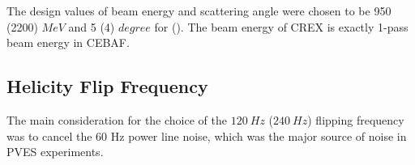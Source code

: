 The design values of beam energy and scattering angle were chosen to be 950 (2200) $MeV$
and 5 (4) $degree$ for \Pb (\Ca). The beam energy of CREX is exactly 1-pass beam
energy in CEBAF.
\begin{comment}
    The measured asymmetry will be:
    \begin{equation*}
	\CA = \frac{2\pi}{R} \int \CA_0(\theta)R(\theta)d\theta
    \end{equation*}

    For PREX-II: average sensitivity reduced by 5\% due to ${}^{12}C$ contamination
    For CREX: average sensitivity reduced by 10\% due to ${}^{40}Ca$ contamination

    While a quartz Cerenkov detector is valued for radiation hardness and insensitivity to soft backgrounds, there is a particular challenge for few GeV electrons. In this energy range, shower fluctuations in a thick or radiated detector significantly degrade energy resolution, while photon statistics degrade the energy resolution for a thin detector. The energy resolution $\Delta E$ at nominal electron energy E increases the statistical error that one would have with infinite resolution $\sigma_0$ to obtain the total statistical error:
$$ \sigma = \sigma_0\sqrt{1+\left(\frac{\Delta E}{E}\right)^2}$$
    
Based on experience in the PREX experiment, we expect an reduction of statistical precision of a factor of 1.06 due to detector resolution.

\bigskip
Using HRS of Hall A, a \textbf{small} scattering angle maximizes the FOM. 
Given practical constraints on how low an angle ($4^\circ$) we can reach with 
septum magnets, the energy is fixed and turns out to be 2.2 GeV, which is a 
natural 1-pass beam energy for CEBAF operations in the 12 GeV era.
\end{comment}

\subsection{Helicity Flip Frequency}
The main consideration for the choice of the $120\ Hz$ ($240\ Hz$) flipping frequency 
was to cancel the 60 Hz power line noise, which was the major source of noise
in PVES experiments. 

